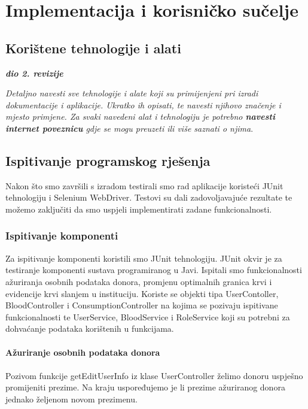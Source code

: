 \chapter{Implementacija i korisničko sučelje}
		
		
		\section{Korištene tehnologije i alati}
		
			\textbf{\textit{dio 2. revizije}}
			
			 \textit{Detaljno navesti sve tehnologije i alate koji su primijenjeni pri izradi dokumentacije i aplikacije. Ukratko ih opisati, te navesti njihovo značenje i mjesto primjene. Za svaki navedeni alat i tehnologiju je potrebno \textbf{navesti internet poveznicu} gdje se mogu preuzeti ili više saznati o njima}.
			
			
			\eject 
		
	
		\section{Ispitivanje programskog rješenja}
			
Nakon što smo završili s izradom testirali smo rad aplikacije koristeći JUnit tehnologiju i Selenium WebDriver. Testovi su dali zadovoljavajuće rezultate te možemo zaključiti da smo uspjeli implementirati zadane funkcionalnosti.
			
			\subsection{Ispitivanje komponenti}
			
Za ispitivanje komponenti koristili smo JUnit tehnologiju. JUnit okvir je za testiranje komponenti sustava programiranog u Javi. Ispitali smo funkcionalnosti ažuriranja osobnih podataka donora, promjenu optimalnih granica krvi i evidencije krvi slanjem u instituciju. Koriste se objekti tipa UserContoller, BloodController i ConsumptionController na kojima se pozivaju ispitivane funkcionalnosti te UserService, BloodService i RoleService koji su potrebni za dohvaćanje podataka korištenih u funkcijama.
\\\\
\textbf{Ažuriranje osobnih podataka donora}
\\\\
Pozivom funkcije getEditUserInfo iz klase UserController želimo donoru uspješno promijeniti prezime. Na kraju uspoređujemo je li prezime ažuriranog donora jednako željenom novom prezimenu.

